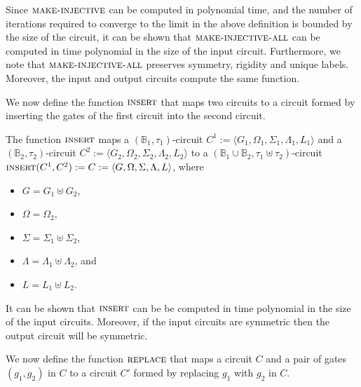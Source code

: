 \documentclass[../paper.tex]{subfiles}
\begin{document}
Since ${\normalfont\textsc{make-injective}}$ can be computed in polynomial time, and the number
of iterations required to converge to the limit in the above definition is
bounded by the size of the circuit, it can be shown that
${\normalfont\textsc{make-injective-all}}$ can be computed in time polynomial in the size of the
input circuit. Furthermore, we note that ${\normalfont\textsc{make-injective-all}}$ preserves
symmetry, rigidity and unique labels. Moreover, the input and output circuits
compute the same function.

We now define the function ${\normalfont\textsc{insert}}$ that maps two circuits to a circuit
formed by inserting the gates of the first circuit into the second circuit.

\begin{definition}
  The function ${\normalfont\textsc{insert}}$ maps a $(\mathbb{B}_1, \tau_1)$-circuit $C^1 :=
  \langle G_1, \Omega_1, \Sigma_1 , \Lambda_1, L_1 \rangle$ and a
  $(\mathbb{B}_2, \tau_2)$-circuit $C^2 := \langle G_2, \Omega_2, \Sigma_2 ,
  \Lambda_2, L_2 \rangle$ to a $(\mathbb{B}_1 \cup \mathbb{B}_2, \tau_1 \uplus
  \tau_2)$-circuit ${\normalfont\textsc{insert}}(C^1, C^2) := C := \langle G, \Omega, \Sigma ,
  \Lambda, L \rangle$, where
  \begin{itemize}
    \setlength\itemsep{0mm}
  \item $G = G_1 \uplus G_2$,
  \item $\Omega = \Omega_2$,
  \item $\Sigma = \Sigma_1 \uplus \Sigma_2$,
  \item $\Lambda = \Lambda_1 \uplus \Lambda_2$, and
  \item $L = L_1 \uplus L_2$.
  \end{itemize}
\end{definition}

It can be shown that ${\normalfont\textsc{insert}}$ can be be computed in time polynomial in the
size of the input circuits. Moreover, if the input circuits are symmetric then
the output circuit will be symmetric.

We now define the function ${\normalfont\textsc{replace}}$ that maps a circuit $C$ and a pair of
gates $(g_1, g_2)$ in $C$ to a circuit $C'$ formed by replacing $g_1$ with $g_2$
in $C$.
\end{document}
